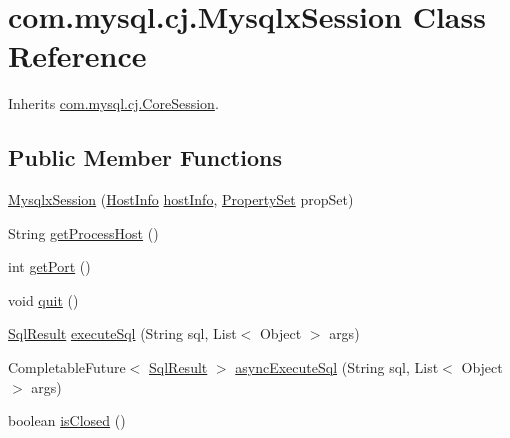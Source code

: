 \hypertarget{classcom_1_1mysql_1_1cj_1_1_mysqlx_session}{}\section{com.\+mysql.\+cj.\+Mysqlx\+Session Class Reference}
\label{classcom_1_1mysql_1_1cj_1_1_mysqlx_session}


Inherits \mbox{\hyperlink{classcom_1_1mysql_1_1cj_1_1_core_session}{com.\+mysql.\+cj.\+Core\+Session}}.

\subsection*{Public Member Functions}
\begin{DoxyCompactItemize}
\item 
\mbox{\hyperlink{classcom_1_1mysql_1_1cj_1_1_mysqlx_session_a1a2c1972d8de7a5e18da310e81ba0547}{Mysqlx\+Session}} (\mbox{\hyperlink{classcom_1_1mysql_1_1cj_1_1conf_1_1_host_info}{Host\+Info}} \mbox{\hyperlink{classcom_1_1mysql_1_1cj_1_1_core_session_ac60f96087dc4f9a719f136f8fb74fddf}{host\+Info}}, \mbox{\hyperlink{interfacecom_1_1mysql_1_1cj_1_1conf_1_1_property_set}{Property\+Set}} prop\+Set)
\item 
String \mbox{\hyperlink{classcom_1_1mysql_1_1cj_1_1_mysqlx_session_aacede9795b96289068a7fe193700cb2c}{get\+Process\+Host}} ()
\item 
int \mbox{\hyperlink{classcom_1_1mysql_1_1cj_1_1_mysqlx_session_a8d8bbd10169ac9d49040a093ec723c35}{get\+Port}} ()
\item 
void \mbox{\hyperlink{classcom_1_1mysql_1_1cj_1_1_mysqlx_session_a20bd0339551fe3c5bb9b5806e2036ed3}{quit}} ()
\item 
\mbox{\hyperlink{interfacecom_1_1mysql_1_1cj_1_1xdevapi_1_1_sql_result}{Sql\+Result}} \mbox{\hyperlink{classcom_1_1mysql_1_1cj_1_1_mysqlx_session_a736c9d536b35c8ffce3da389060de4d6}{execute\+Sql}} (String sql, List$<$ Object $>$ args)
\item 
Completable\+Future$<$ \mbox{\hyperlink{interfacecom_1_1mysql_1_1cj_1_1xdevapi_1_1_sql_result}{Sql\+Result}} $>$ \mbox{\hyperlink{classcom_1_1mysql_1_1cj_1_1_mysqlx_session_a309528046194a468f181727415fddb51}{async\+Execute\+Sql}} (String sql, List$<$ Object $>$ args)
\item 
boolean \mbox{\hyperlink{classcom_1_1mysql_1_1cj_1_1_mysqlx_session_a1507b9d1e31b712971270eb58a291f3b}{is\+Closed}} ()
\end{DoxyCompactItemize}
